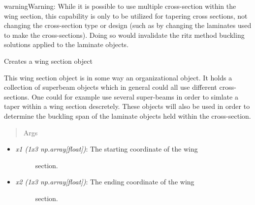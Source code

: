 \documentclass[letterpaper,10pt,english]{sphinxmanual}
\begin{document}
\begin{fulllineitems}
\begin{itemize}
\end{itemize}

\begin{notice}{warning}{Warning:}
While it is possible to use multiple cross-section within the
wing section, this capability is only to be utilized for tapering cross
sections, not changing the cross-section type or design (such as by
changing the laminates used to make the cross-sections). Doing so would
invalidate the ritz method buckling solutions applied to the laminate
objects.
\end{notice}

\begin{fulllineitems}
\label{structures:AeroComBAT.Structures.WingSection.__init__}
Creates a wing section object

This wing section object is in some way an organizational object. It
holds a collection of superbeam objects which in general could all use
different cross-sections. One could for example use several super-beams
in order to simlate a taper within a wing section descretely. These
objects will also be used in order to determine the buckling span of
the laminate objects held within the cross-section.
\begin{quote}\begin{description}
\item[{Args}] \leavevmode
\end{description}\end{quote}
\begin{itemize}
\item {} \begin{description}
\item[{\emph{x1 (1x3 np.array{[}float{]})}: The starting coordinate of the wing}] \leavevmode
section.

\end{description}

\item {} \begin{description}
\item[{\emph{x2 (1x3 np.array{[}float{]})}: The ending coordinate of the wing}] \leavevmode
section.

\end{description}


\end{itemize}
\end{fulllineitems}
\end{fulllineitems}
\end{document}
